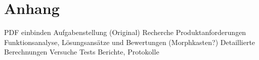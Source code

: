 \section{Anhang}

PDF einbinden
Aufgabenstellung (Original)
Recherche
Produktanforderungen
Funktionsanalyse, Lösungsansätze und Bewertungen (Morphkasten?)
Detaillierte Berechnungen
Versuche Tests
Berichte, Protokolle